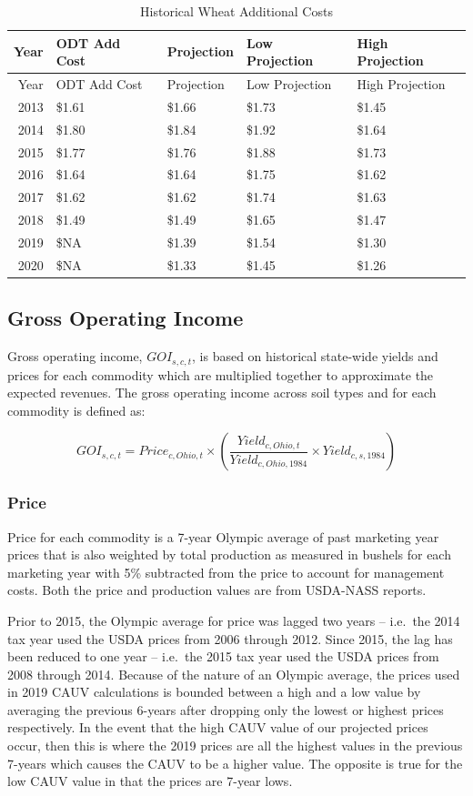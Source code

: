 \documentclass[]{article}
\begin{document}
\begin{longtable}[]{@{}rllll@{}}
\caption{Historical Wheat Additional Costs}\tabularnewline
\toprule
Year & ODT Add Cost & Projection & Low Projection & High
Projection\tabularnewline
\midrule
\endfirsthead
\toprule
Year & ODT Add Cost & Projection & Low Projection & High
Projection\tabularnewline
\midrule
\endhead
2013 & \$1.61 & \$1.66 & \$1.73 & \$1.45\tabularnewline
2014 & \$1.80 & \$1.84 & \$1.92 & \$1.64\tabularnewline
2015 & \$1.77 & \$1.76 & \$1.88 & \$1.73\tabularnewline
2016 & \$1.64 & \$1.64 & \$1.75 & \$1.62\tabularnewline
2017 & \$1.62 & \$1.62 & \$1.74 & \$1.63\tabularnewline
2018 & \$1.49 & \$1.49 & \$1.65 & \$1.47\tabularnewline
2019 & \$NA & \$1.39 & \$1.54 & \$1.30\tabularnewline
2020 & \$NA & \$1.33 & \$1.45 & \$1.26\tabularnewline
\bottomrule
\end{longtable}

\newpage

\hypertarget{gross-operating-income}{%
\subsection{Gross Operating Income}\label{gross-operating-income}}

Gross operating income, \(GOI_{s,c,t}\), is based on historical
state-wide yields and prices for each commodity which are multiplied
together to approximate the expected revenues. The gross operating
income across soil types and for each commodity is defined as:

\[
GOI_{s,c,t} = Price_{c,Ohio,t} \times \left( \frac{Yield_{c,Ohio,t}}{Yield_{c,Ohio,1984}} \times Yield_{c,s,1984} \right)
\]

\hypertarget{price}{%
\subsubsection{Price}\label{price}}

Price for each commodity is a 7-year Olympic average of past marketing
year prices that is also weighted by total production as measured in
bushels for each marketing year with 5\% subtracted from the price to
account for management costs. Both the price and production values are
from USDA-NASS reports.

Prior to 2015, the Olympic average for price was lagged two years --
i.e.~the 2014 tax year used the USDA prices from 2006 through 2012.
Since 2015, the lag has been reduced to one year -- i.e.~the 2015 tax
year used the USDA prices from 2008 through 2014. Because of the nature
of an Olympic average, the prices used in 2019 CAUV calculations is
bounded between a high and a low value by averaging the previous 6-years
after dropping only the lowest or highest prices respectively. In the
event that the high CAUV value of our projected prices occur, then this
is where the 2019 prices are all the highest values in the previous
7-years which causes the CAUV to be a higher value. The opposite is true
for the low CAUV value in that the prices are 7-year lows.
\end{document}
